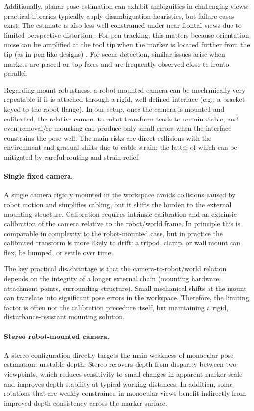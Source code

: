 Additionally, planar pose estimation can exhibit ambiguities in challenging views; practical libraries typically apply disambiguation heuristics, but failure cases exist. The estimate is also less well constrained under near-frontal views due to limited perspective distortion \cite{Rijlaarsdam2022}. For pen tracking, this matters because orientation noise can be amplified at the tool tip when the marker is located further from the tip (as in pen-like designs) \cite{dpoint_github}. For scene detection, similar issues arise when markers are placed on top faces and are frequently observed close to fronto-parallel.

Regarding mount robustness, a robot-mounted camera can be mechanically very repeatable if it is attached through a rigid, well-defined interface (e.g., a bracket keyed to the robot flange). In our setup, once the camera is mounted and calibrated, the relative camera-to-robot transform tends to remain stable, and even removal/re-mounting can produce only small errors when the interface constrains the pose well. The main risks are direct collisions with the environment and gradual shifts due to cable strain; the latter of which can be mitigated by careful routing and strain relief.

\paragraph{Single fixed camera.}
A single camera rigidly mounted in the workspace avoids collisions caused by robot motion and simplifies cabling, but it shifts the burden to the external mounting structure. Calibration requires intrinsic calibration and an extrinsic calibration of the camera relative to the robot/world frame. In principle this is comparable in complexity to the robot-mounted case, but in practice the calibrated transform is more likely to drift: a tripod, clamp, or wall mount can flex, be bumped, or settle over time.

The key practical disadvantage is that the camera-to-robot/world relation depends on the integrity of a longer external chain (mounting hardware, attachment points, surrounding structure). Small mechanical shifts at the mount can translate into significant pose errors in the workspace. Therefore, the limiting factor is often not the calibration procedure itself, but maintaining a rigid, disturbance-resistant mounting solution.

\paragraph{Stereo robot-mounted camera.}
A stereo configuration directly targets the main weakness of monocular pose estimation: unstable depth. Stereo recovers depth from disparity between two viewpoints, which reduces sensitivity to small changes in apparent marker scale and improves depth stability at typical working distances. In addition, some rotations that are weakly constrained in monocular views benefit indirectly from improved depth consistency across the marker surface.

